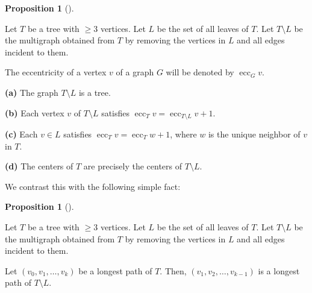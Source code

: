 \documentclass[numbers=enddot,12pt,final,onecolumn,notitlepage]{scrartcl}%
\theoremstyle{definition}
\newtheorem{prop}[theo]{Proposition}
\newenvironment{proposition}[1][]
{\begin{prop}[#1]\begin{leftbar}}
{\end{leftbar}\end{prop}}
\newcommand{\tup}[1]{\left( #1 \right)}
\begin{document}
\begin{proposition} \label{prop.hw3.centerlp.center-ind}
Let $T$ be a tree with $\geq 3$ vertices.
Let $L$ be the set of all leaves of $T$.
Let $T \setminus L$ be the multigraph obtained from $T$ by removing
the vertices in $L$ and all edges incident to them.

The eccentricity of a vertex $v$ of a graph $G$ will be denoted by
$\operatorname{ecc}_G v$.

\textbf{(a)} The graph $T \setminus L$ is a tree.

\textbf{(b)} Each vertex $v$ of $T \setminus L$ satisfies
$\operatorname{ecc}_T v = \operatorname{ecc}_{T \setminus L} v + 1$.

\textbf{(c)} Each $v \in L$ satisfies
$\operatorname{ecc}_T v = \operatorname{ecc}_T w + 1$,
where $w$ is the unique neighbor of $v$ in $T$.

\textbf{(d)} The centers of $T$ are precisely the centers of
$T \setminus L$.
\end{proposition}

We contrast this with the following simple fact:

\begin{proposition} \label{prop.hw3.centerlp.lopa-ind}
Let $T$ be a tree with $\geq 3$ vertices.
Let $L$ be the set of all leaves of $T$.
Let $T \setminus L$ be the multigraph obtained from $T$ by removing
the vertices in $L$ and all edges incident to them.

Let $\tup{v_0, v_1, \ldots, v_k}$ be a longest path of $T$.
Then, $\tup{v_1, v_2, \ldots, v_{k-1}}$ is a longest path of
$T \setminus L$.
\end{proposition}
\end{document}
